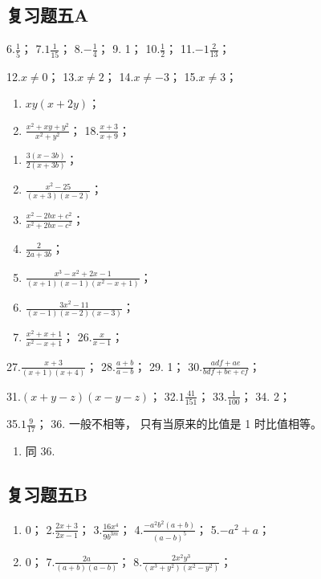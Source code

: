 \subsection{复习题五A}

6.\(\frac{1}{5}\)； 7.\(1\frac{1}{15}\)； 8.\(-\frac{1}{4}\)； 9. 1；
10.\(\frac{1}{2}\)； 11.\(-1\frac{2}{13}\)；

12.\(x \neq 0\)； 13.\(x \neq 2\)； 14.\(x \neq -3\)； 15.\(x \neq 3\)；
\begin{enumerate}[start=16]
\item
  \(xy(x + 2y)\)；
\item
  \(\frac{x^2 + xy + y^2}{x^2 + y^2}\)； 18.\(\frac{x + 3}{x + 9}\)；
\end{enumerate}
\begin{enumerate}[start=19]
\item
  \(\frac{3(x - 3b)}{2(x + 3b)}\)；
\item
  \(\frac{x^2 - 25}{(x + 3)(x - 2)}\)；
\item
  \(\frac{x^2 - 2bx + c^2}{x^2 + 2bx - c^2}\)；
\item
  \(\frac{2}{2a + 3b}\)；
\item
  \(\frac{x^3 - x^2 + 2x - 1}{(x + 1)(x - 1)(x^2 - x + 1)}\)；
\item
  \(\frac{3x^2 - 11}{(x - 1)(x - 2)(x - 3)}\)；
\item
  \(\frac{x^2 + x + 1}{x^2 - x + 1}\)； 26.\(\frac{x}{x - 1}\)；
\end{enumerate}

27.\(\frac{x + 3}{(x + 1)(x + 4)}\)； 28.\(\frac{a + b}{a - b}\)； 29.
1； 30.\(\frac{adf + ae}{bdf + be + cf}\)；

31.\((x + y - z)(x - y - z)\)； 32.\(1\frac{41}{151}\)；
33.\(\frac{1}{100}\)； 34. 2；

35.\(1\frac{9}{17}\)； 36. 一般不相等， 只有当原来的比值是 1
时比值相等。

\begin{enumerate}[start=37]
\item
  同 36.
\end{enumerate}

\subsection{复习题五B}

\begin{enumerate}
\item
  0； 2.\(\frac{2x + 3}{2x - 1}\)； 3.\(\frac{16x^4}{9b^{3m}}\)；
  4.\(\frac{-a^2b^2(a + b)}{(a - b)^5}\)； 5.\(-a^2 + a\)；
\item
  0； 7.\(\frac{2a}{(a + b)(a - b)}\)；
  8.\(\frac{2x^2y^3}{(x^3 + y^2)(x^2 - y^2)}\)；
\end{enumerate}

